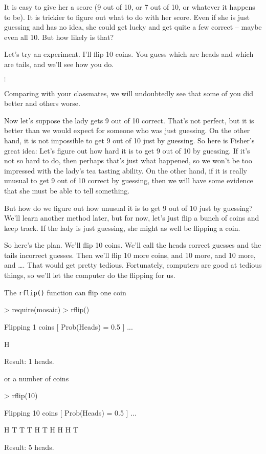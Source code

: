 It is easy to give her a score (9 out of 10, or 7 out of 10, or whatever
it happens to be).  It is trickier to figure out what to do with her score.
Even if she is just guessing and has no idea, she could get lucky and 
get quite a few correct -- maybe even all 10.  But how likely is that?

Let's try an experiment.  I'll flip 10 coins.  You guess which are heads and
which are tails, and we'll see how you do.  

$\vdots$

Comparing with your classmates, we will undoubtedly see that some 
of you did better and others worse.

Now let's suppose the lady gets 9 out of 10 correct.  That's not perfect,
but it is better than we would expect for someone who was just guessing.
On the other hand, it is not impossible to get 9 out of 10 just by guessing.
So here is Fisher's great idea:  Let's figure out how hard it is to get
9 out of 10 by guessing.  If it's not so hard to do, then perhaps that's 
just what happened, so we won't be too impressed with the lady's tea tasting
ability.  On the other hand, if it is really unusual to get 9 out of 10 
correct by guessing, then we will have some evidence that she must 
be able to tell something.

But how do we figure out how unusual it is to get 9 out of 10 just by 
guessing?  We'll learn another method later, but for now, let's just 
flip a bunch of coins and keep track.  If the lady is just guessing, she 
might as well be flipping a coin.

So here's the plan.  We'll flip 10 coins.  We'll call the heads correct 
guesses and the tails incorrect guesses.  Then we'll flip 10 more coins,
and 10 more, and 10 more, and \dots.  That would get pretty tedious.
Fortunately, computers are good at tedious things, so we'll let the computer 
do the flipping for us.

The \verb!rflip()! function can flip one coin

\begin{Schunk}
\begin{Sinput}
> require(mosaic)
> rflip()
\end{Sinput}
\begin{Soutput}
Flipping 1 coins [ Prob(Heads) = 0.5 ] ...

H

Result: 1 heads.
\end{Soutput}
\end{Schunk}
or a number of coins
\begin{Schunk}
\begin{Sinput}
> rflip(10)
\end{Sinput}
\begin{Soutput}
Flipping 10 coins [ Prob(Heads) = 0.5 ] ...

H T T T H T H H H T

Result: 5 heads.
\end{Soutput}
\end{Schunk}

